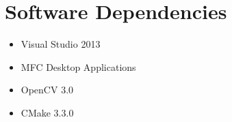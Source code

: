 \newpage
\section{Software Dependencies}
\begin{itemize}
\item{Visual Studio 2013}
\item{MFC Desktop Applications}
\item{OpenCV 3.0}
\item{CMake 3.3.0}
\end{itemize}